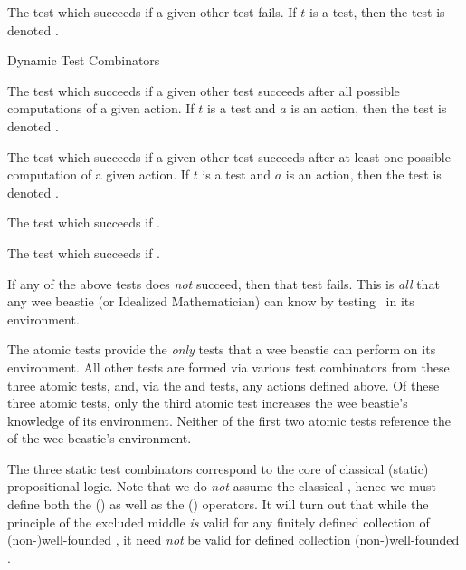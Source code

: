 \item The test which succeeds if a given other test fails. If $t$ is a 
test, then the  test is denoted . 

\stopitemize

\item Dynamic Test Combinators

\startitemize[n]

\item The test which succeeds if a given other test succeeds after all 
possible computations of a given action. If $t$ is a test and $a$ is an 
action, then the  test is denoted . 

\item The test which succeeds if a given other test succeeds after at 
least one possible computation of a given action. If $t$ is a test and $a$ 
is an action, then the  test is denoted 
. 

\item The test which succeeds if .

\item The test which succeeds if . 

\stopitemize

\stopitemize

If any of the above tests does \emph{not} succeed, then that test fails. 
This is \emph{all} that any wee beastie (or Idealized Mathematician) can 
know by testing \lols\ in its environment. 

\stopDefinition

\startMMundi

The atomic tests provide the \emph{only} tests that a wee beastie can 
perform \emph{} on its environment. All other tests are 
formed via various test combinators from these three atomic tests, and, 
via the  and  tests, any actions 
defined above. Of these three atomic tests, only the third atomic test 
increases the wee beastie's knowledge of its environment. Neither of the 
first two atomic tests reference the  of the wee beastie's 
environment. 

The three static test combinators correspond to the core of classical 
(static) propositional logic. Note that we do \emph{not} assume the 
classical , hence we must define 
both the   () as well as the 
  () operators. It will turn 
out that while the principle of the excluded middle \emph{is} valid for 
any finitely defined collection of (non-)well-founded \lols, it need 
\emph{not} be valid for  defined collection 
(non-)well-founded \lols. 

